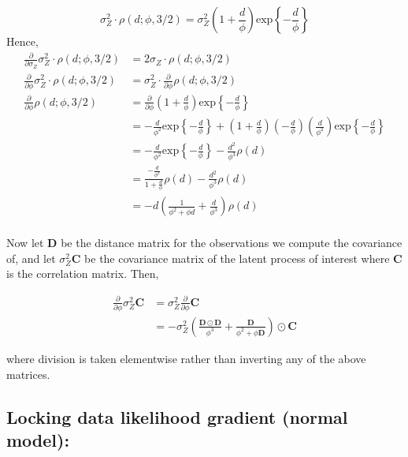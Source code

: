 {$$ \sigma_Z^2 \cdot \rho(d; \phi, 3/2) = \sigma_Z^2 \left( 1 + \frac{d}{\phi} \right) \text{exp} \left\{ -\frac{d}{\phi} \right \} $$
Hence,
\begin{align*}
\frac{\partial}{\partial \sigma_Z} \sigma_Z^2 \cdot \rho(d; \phi, 3/2) &= 2\sigma_Z \cdot \rho(d;\phi, 3/2) \\
\frac{\partial}{\partial \phi} \sigma_Z^2 \cdot \rho(d; \phi, 3/2) &= \sigma_Z^2 \cdot \frac{\partial}{\partial \phi} \rho(d; \phi, 3/2) \\
\frac{\partial}{\partial \phi} \rho(d; \phi, 3/2) &= \frac{\partial}{\partial \phi} \left( 1 + \frac{d}{\phi} \right) \text{exp} \left\{ -\frac{d}{\phi} \right \} \\
&= -\frac{d}{\phi^2} \text{exp} \left \{ -\frac{d}{\phi} \right \} + \left( 1 + \frac{d}{\phi} \right) \left(-\frac{d}{\phi} \right) \left( \frac{d}{\phi^2} \right) \text{exp} \left \{ -\frac{d}{\phi} \right \} \\
&= -\frac{d}{\phi^2} \text{exp} \left \{ -\frac{d}{\phi} \right \} - \frac{d^2}{\phi^3} \rho(d) \\
&= \frac{-\frac{d}{\phi^2}}{1 + \frac{d}{\phi}} \rho(d) - \frac{d^2}{\phi^3} \rho(d) \\
&= - d \left(\frac{1}{\phi^2 + \phi d} + \frac{d}{\phi^3} \right) \rho(d) \\
\end{align*}

Now let $\mathbf{D}$ be the distance matrix for the observations we compute the covariance of, and let $\sigma_Z^2 \mathbf{C}$ be the covariance matrix of the latent process of interest where $\mathbf{C}$ is the correlation matrix.  Then, 

\begin{align*}
\frac{\partial}{\partial \phi} \sigma_Z^2 \mathbf{C} &= \sigma_Z^2 \frac{\partial}{\partial \phi} \mathbf{C} \\
&= -\sigma_Z^2 \left( \frac{\mathbf{D} \odot \mathbf{D}}{\phi^3} + \frac{\mathbf{D}}{\phi^2 + \phi \mathbf{D}} \right) \odot \mathbf{C}
\end{align*}

where division is taken elementwise rather than inverting any of the above matrices.

\subsection*{Locking data likelihood gradient (normal model):}

}

